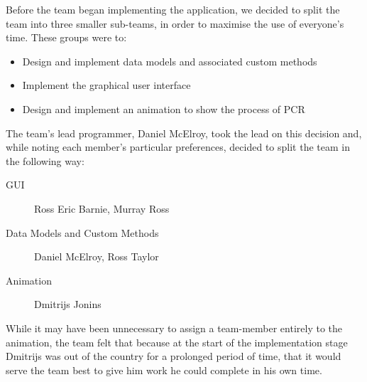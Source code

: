 Before the team began implementing the application, we decided to
split the team into three smaller sub-teams, in order to maximise the
use of everyone's time.
These groups were to:
\begin{itemize}
\item Design and implement data models and associated custom methods
\item Implement the graphical user interface
\item Design and implement an animation to show the process of PCR
\end{itemize}

The team's lead programmer, Daniel McElroy, took the lead on this
decision and, while noting each member's particular preferences,
decided to split the team in the following way:
\begin{description}
\item[GUI]{Ross Eric Barnie, Murray Ross}
\item[Data Models and Custom Methods] {Daniel McElroy, Ross Taylor}
\item[Animation] {Dmitrijs Jonins}
\end{description}

While it may have been unnecessary to assign a team-member entirely to
the animation, the team felt that because at the start of the
implementation stage Dmitrijs was out of the country for a prolonged
period of time, that it would serve the team best to give him work he
could complete in his own time.